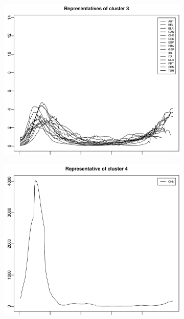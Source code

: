 \documentclass[a4paper,11pt]{article}
\numberwithin{equation}{section}
\begin{document}
\begin{figure}[t!]
\begin{subfigure}[b]{0.475\textwidth}
\end{subfigure}\\
\begin{subfigure}[b]{0.475\textwidth}
\includegraphics[width=\textwidth]{plots/results_cluster_3}
\caption{}\label{fig:cl3}
\end{subfigure}\hspace{0.25cm}
\begin{subfigure}[b]{0.475\textwidth}
\includegraphics[width=\textwidth]{plots/results_cluster_4}

\end{subfigure}
\end{figure}
\end{document}
